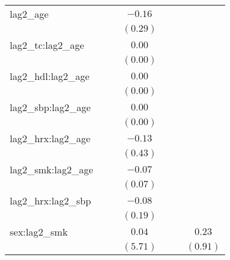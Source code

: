\begin{tabular}{l c c c c c c}
lag2\_age                         &              &            & $-0.16$    &                &                &                \\
                                  &              &            & $(0.29)$   &                &                &                \\
lag2\_tc:lag2\_age                &              &            & $0.00$     &                &                &                \\
                                  &              &            & $(0.00)$   &                &                &                \\
lag2\_hdl:lag2\_age               &              &            & $0.00$     &                &                &                \\
                                  &              &            & $(0.00)$   &                &                &                \\
lag2\_sbp:lag2\_age               &              &            & $0.00$     &                &                &                \\
                                  &              &            & $(0.00)$   &                &                &                \\
lag2\_hrx:lag2\_age               &              &            & $-0.13$    &                &                &                \\
                                  &              &            & $(0.43)$   &                &                &                \\
lag2\_smk:lag2\_age               &              &            & $-0.07$    &                &                &                \\
                                  &              &            & $(0.07)$   &                &                &                \\
lag2\_hrx:lag2\_sbp               &              &            & $-0.08$    &                &                &                \\
                                  &              &            & $(0.19)$   &                &                &                \\
sex:lag2\_smk                     &              &            & $0.04$     &                &                & $0.23$         \\
                                  &              &            & $(5.71)$   &                &                & $(0.91)$       \\

\end{tabular}
